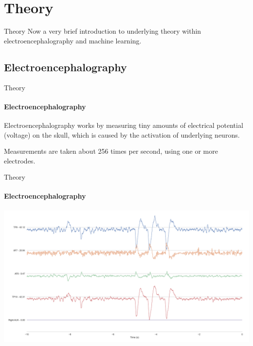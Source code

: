 \documentclass[xcolor={dvipsnames,table},12pt]{beamer}
\newif\ifplacelogo{}  %
\begin{document}
\section{Theory}
\begin{frame}{Theory}
    Now a very brief introduction to underlying theory within electroencephalography and machine learning.
\end{frame}

\subsection{Electroencephalography}
\begin{frame}{Theory}
    \framesubtitle{Electroencephalography}

    Electroencephalography works by measuring tiny amounts of electrical potential (voltage) on the skull, which is caused by the activation of underlying neurons.

    Measurements are taken about 256 times per second, using one or more electrodes.
\end{frame}

\placelogofalse{}
\begin{frame}{Theory}
    \framesubtitle{Electroencephalography}
    \vspace*{-5mm}

    \hspace*{-10mm}
    \includegraphics[width=\paperwidth]{img/muselsl-signal.png}
\end{frame}
\placelogotrue{}
\end{document}
